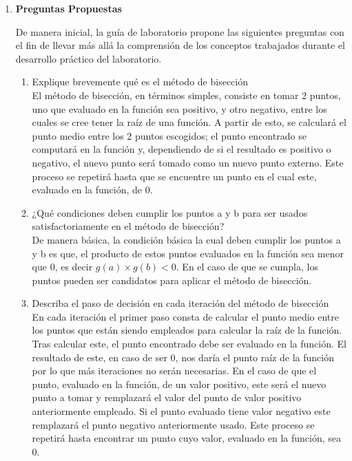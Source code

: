 \documentclass[english,notitlepage,letterpaper, 10pt]{article} %
\begin{document}
  \begin{enumerate}
    \item \textbf{Preguntas Propuestas}
    
    De manera inicial, la guía de laboratorio propone las siguientes preguntas con el fin de llevar
    más allá la comprensión de los conceptos trabajados durante el desarrollo práctico del laboratorio.

    \begin{enumerate}

      \item Explique brevemente qué es el método de bisección\\
      El método de bisección, en términos simples, consiste en tomar 2 puntos, uno que evaluado en la función sea positivo, y otro negativo, entre los cuales se cree tener la raíz de una función. A partir de esto, se calculará el punto medio entre los 2 puntos escogidos; el punto encontrado se computará en la función y, dependiendo de si el resultado es positivo o negativo, el nuevo punto será tomado como un nuevo punto externo. Este proceso se repetirá hasta que se encuentre un punto en el cual este, evaluado en la función, de 0. 

      \item ¿Qué condiciones deben cumplir los puntos a y b para ser usados satisfactoriamente en el método de bisección? \\
      De manera básica, la condición básica la cual deben cumplir los puntos a y b es que, el producto de estos puntos evaluados en la función sea menor que 0, es decir $g(a) \times g(b) < 0$. En el caso de que se cumpla, los puntos pueden ser candidatos para aplicar el método de bisección.

      \item Describa el paso de decisión en cada iteración del método de bisección \\
      En cada iteración el primer paso consta de calcular el punto medio entre los puntos que están siendo empleados para calcular la raíz de la función. Tras calcular este, el punto encontrado debe ser evaluado en la función. El resultado de este, en caso de ser 0, nos daría el punto raíz de la función por lo que más iteraciones no serán necesarias. En el caso de que el punto, evaluado en la función, de un valor positivo, este será el nuevo punto a tomar y remplazará el valor del punto de valor positivo anteriormente empleado. Si el punto evaluado tiene valor negativo este remplazará el punto negativo anteriormente usado. Este proceso se repetirá hasta encontrar un punto cuyo valor, evaluado en la función, sea 0.


\end{enumerate}
\end{enumerate}
\end{document}
